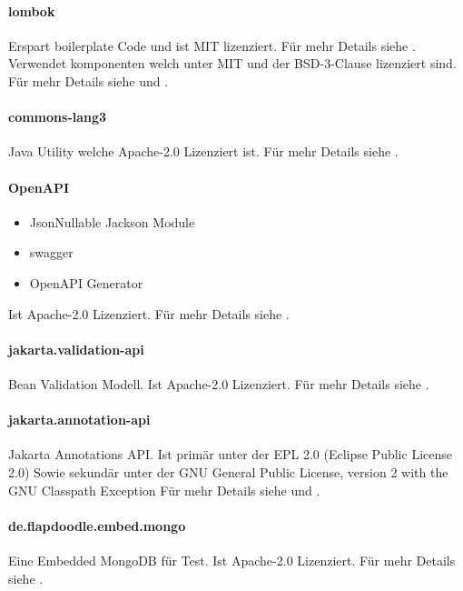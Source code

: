 \paragraph{lombok}
Erspart boilerplate Code und ist MIT lizenziert.
Für mehr Details siehe .\\
Verwendet komponenten welch unter MIT und der BSD-3-Clause lizenziert sind.
Für mehr Details siehe  und .

\paragraph{commons-lang3}
Java Utility welche Apache-2.0 Lizenziert ist.
Für mehr Details siehe .

\paragraph{OpenAPI}
\begin{itemize}
    \item JsonNullable Jackson Module
    \item swagger
    \item OpenAPI Generator
\end{itemize}
Ist Apache-2.0 Lizenziert.
Für mehr Details siehe .

\paragraph{jakarta.validation-api}
Bean Validation Modell.
Ist Apache-2.0 Lizenziert.
Für mehr Details siehe .

\paragraph{jakarta.annotation-api}
Jakarta Annotations API.
Ist primär unter der EPL 2.0 (Eclipse Public License 2.0)
Sowie sekundär unter der GNU General Public License, version 2 with the GNU Classpath Exception
Für mehr Details siehe  und .

\paragraph{de.flapdoodle.embed.mongo}
Eine Embedded MongoDB für Test.
Ist Apache-2.0 Lizenziert.
Für mehr Details siehe .

